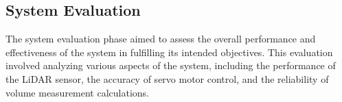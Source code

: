 


\subsection{System Evaluation}
The system evaluation phase aimed to assess the overall performance and effectiveness of the system in fulfilling its intended objectives. This evaluation involved analyzing various aspects of the system, including the performance of the LiDAR sensor, the accuracy of servo motor control, and the reliability of volume measurement calculations.

